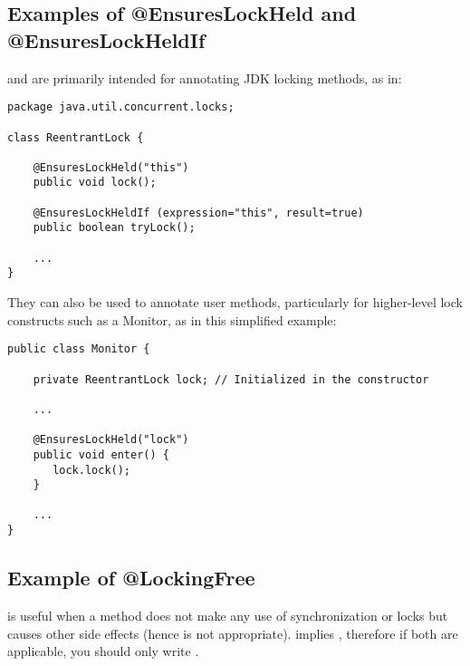 \subsection{Examples of @EnsuresLockHeld and @EnsuresLockHeldIf\label{ensureslockheld-examples}}

 and  are primarily intended
for annotating JDK locking methods, as in:

\begin{Verbatim}
package java.util.concurrent.locks;

class ReentrantLock {

    @EnsuresLockHeld("this")
    public void lock();

    @EnsuresLockHeldIf (expression="this", result=true)
    public boolean tryLock();

    ...
}
\end{Verbatim}

They can also be used to annotate user methods, particularly for
higher-level lock constructs such as a Monitor, as in this simplified example:

\begin{Verbatim}
public class Monitor {

    private ReentrantLock lock; // Initialized in the constructor

    ...

    @EnsuresLockHeld("lock")
    public void enter() {
       lock.lock();
    }

    ...
}
\end{Verbatim}

\subsection{Example of @LockingFree\label{lock-lockingfree-example}}

 is useful when a method does not make any use of synchronization
or locks but causes other side effects (hence  is not appropriate).
 implies , therefore if both are applicable,
you should only write .


